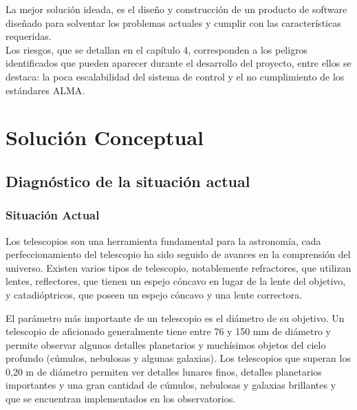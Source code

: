 \documentclass[letterpaper,titlepage,spanish,10pt]{article}
\begin{document}
La mejor soluci\'on ideada, es el dise\~no y construcci\'on de un producto de software dise\~nado 
para solventar los problemas actuales y cumplir con las características requeridas.\\

Los riesgos, que se detallan en el cap\'itulo 4, corresponden a los peligros identificados 
que pueden aparecer durante el desarrollo del proyecto, entre ellos se destaca: la poca 
escalabilidad del sistema de control y el no cumplimiento de los est\'andares ALMA.




\newpage
\section{Soluci\'on Conceptual} %
\subsection{Diagn\'ostico de la situaci\'on actual}
\subsubsection{Situaci\'on Actual}

Los telescopios son una herramienta fundamental para la astronom\'ia, cada
perfeccionamiento del telescopio ha sido seguido de avances en la comprensi\'on 
del universo.
Existen varios tipos de telescopio, notablemente refractores, que utilizan 
lentes, reflectores, que tienen un espejo c\'oncavo en lugar de la lente del
 objetivo, y catadi\'optricos, que poseen un espejo c\'oncavo y una lente correctora.

El par\'ametro m\'as importante de un telescopio es el di\'ametro de su objetivo. 
Un telescopio de aficionado generalmente tiene entre 76 y 150 mm de di\'ametro y 
permite observar algunos detalles planetarios y much\'isimos objetos del cielo 
profundo (c\'umulos, nebulosas y algunas galaxias). Los telescopios que superan  
los 0,20 m de di\'ametro permiten ver detalles lunares finos, detalles planetarios 
importantes y una gran cantidad de c\'umulos, nebulosas y galaxias brillantes 
y que se encuentran implementados en los observatorios.
\end{document}

